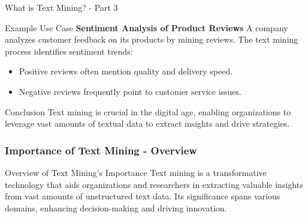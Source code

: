 \documentclass[aspectratio=169]{beamer}
\begin{document}
\begin{frame}[fragile]{What is Text Mining? - Part 3}
    \begin{block}{Example Use Case}
        \textbf{Sentiment Analysis of Product Reviews}  
        A company analyzes customer feedback on its products by mining reviews. The text mining process identifies sentiment trends:
        \begin{itemize}
            \item Positive reviews often mention quality and delivery speed.
            \item Negative reviews frequently point to customer service issues.
        \end{itemize}
    \end{block}
    
    \begin{block}{Conclusion}
        Text mining is crucial in the digital age, enabling organizations to leverage vast amounts of textual data to extract insights and drive strategies.
    \end{block}
\end{frame}

\begin{frame}[fragile]
    \frametitle{Importance of Text Mining - Overview}
    \begin{block}{Overview of Text Mining's Importance}
        Text mining is a transformative technology that aids organizations and researchers in extracting valuable insights from vast amounts of unstructured text data. Its significance spans various domains, enhancing decision-making and driving innovation.
    \end{block}
\end{frame}
\end{document}
